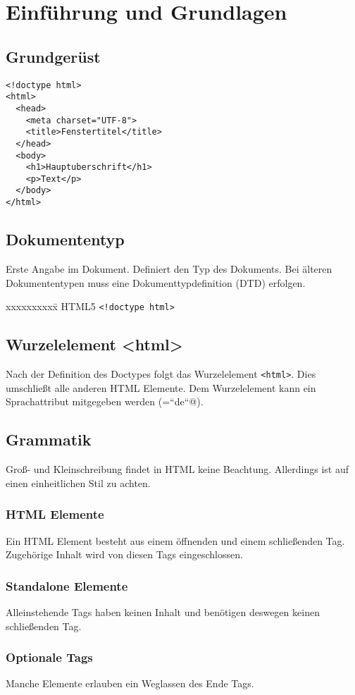 \chapter{Einführung und Grundlagen} 
\section{Grundgerüst}
\begin{lstlisting}[caption=''HTML Grundgerüst'']
<!doctype html>
<html>
  <head>
    <meta charset="UTF-8">
    <title>Fenstertitel</title>
  </head>
  <body>
    <h1>Hauptuberschrift</h1>
    <p>Text</p>
  </body>
</html>
\end{lstlisting}
\section{Dokumententyp}
Erste Angabe im Dokument. Definiert den Typ des Dokuments. Bei älteren Dokumententypen muss eine Dokumenttypdefinition (DTD) erfolgen.\\[-1.5em]
\begin{tabbing}
xxxxxxxxxx\=\kill
HTML5	\>\verb=<!doctype html>=\\
\end{tabbing}
\section{Wurzelelement <html>}
Nach der Definition des Doctypes folgt das Wurzelelement \texttt{<html>}. Dies umschließt alle anderen HTML Elemente. Dem Wurzelelement kann ein Sprachattribut mitgegeben werden (\verb@lang=“de“@).
\section{Grammatik}
Groß- und Kleinschreibung findet in HTML keine Beachtung. Allerdings ist auf einen einheitlichen Stil zu achten.
\subsection*{HTML Elemente}
Ein HTML Element besteht aus einem öffnenden und einem schließenden Tag. Zugehörige Inhalt wird von diesen Tags eingeschlossen.
\subsection*{Standalone Elemente}
Alleinstehende Tags haben keinen Inhalt und benötigen deswegen keinen schließenden Tag.
\subsection*{Optionale Tags}
Manche Elemente erlauben ein Weglassen des Ende Tags.
